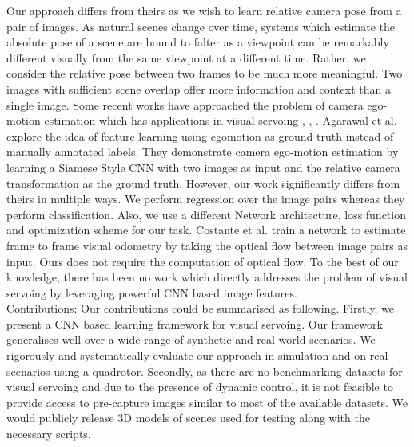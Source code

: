 \documentclass[usletter, 10 pt, conference]{ieeeconf}  %
\begin{document}
Our approach differs from theirs as we wish to learn relative camera pose from a pair of images. As natural scenes change over time, systems which estimate the absolute pose of a scene are bound to falter as a viewpoint can be remarkably different visually from the same viewpoint at a different time. Rather, we consider the relative pose between two frames to be much more meaningful. Two images with sufficient scene overlap offer more information and context than a single image. Some recent works have approached the problem of camera ego-motion estimation which has applications in visual servoing \cite{agrawal2015learning}, \cite{costante2016exploring}, \cite{konda2015learning}. Agarawal et al. \cite{agrawal2015learning} explore the idea of feature learning using egomotion as ground truth instead of manually annotated labels. They demonstrate camera ego-motion estimation by learning a Siamese Style CNN with two images as input and the relative camera transformation as the ground truth. However, our work significantly differs from theirs in multiple ways. We perform regression over the image pairs whereas they perform classification. Also, we use a different Network architecture, loss function and optimization scheme for our task. Costante et al. \cite{costante2016exploring} train a network to estimate frame to frame visual odometry by taking the optical flow between image pairs as input. Ours does not require the computation of optical flow. To the best of our knowledge, there has been no work which directly addresses the problem of visual servoing by leveraging powerful CNN based image features.\\  
\indent Contributions: Our contributions could be summarised as following.
 Firstly, we present a CNN based learning framework for visual servoing. Our framework generalises well over a wide range of synthetic and real world scenarios. We rigorously and systematically evaluate our approach in simulation and on real scenarios using a quadrotor.
 Secondly, as there are no benchmarking datasets for visual servoing and due to the presence of dynamic control, it is not feasible to provide access to pre-capture images similar to most of the available datasets. We would publicly release $3$D models of scenes used for testing along with the necessary scripts.
\end{document}
